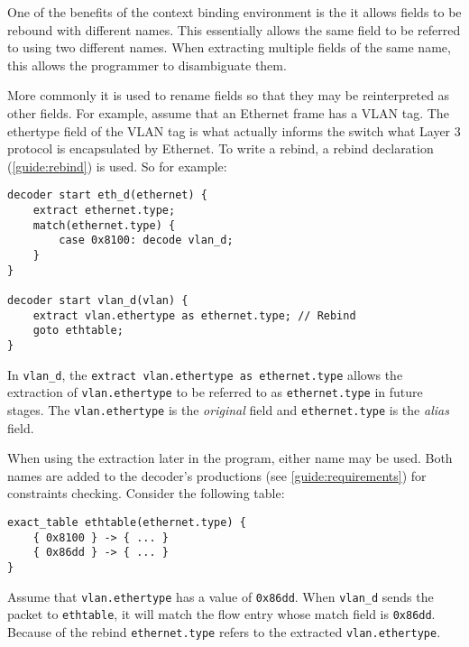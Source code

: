 One of the benefits of the context binding environment is the it
allows fields to be rebound with different names. This essentially
allows the same field to be referred to using two different names.
When extracting multiple fields of the same name, this allows the
programmer to disambiguate them. 

More commonly it is used to rename fields so that they may be reinterpreted as other fields. For example, assume that an Ethernet
frame has a VLAN tag. The ethertype field of the VLAN tag is what 
actually informs the switch what Layer 3 protocol is encapsulated
by Ethernet. 
To write a rebind, a rebind declaration (\ref{guide:rebind}) is used.
So for example:

\begin{codepage}
\begin{lstlisting}
decoder start eth_d(ethernet) {
	extract ethernet.type;
	match(ethernet.type) {
		case 0x8100: decode vlan_d;
	}
}

decoder start vlan_d(vlan) {
	extract vlan.ethertype as ethernet.type; // Rebind
	goto ethtable;
}
\end{lstlisting}
\end{codepage}

In \texttt{vlan\_d}, the \texttt{extract vlan.ethertype as ethernet.type} allows the extraction of \texttt{vlan.ethertype} to be referred to as
\texttt{ethernet.type} in future stages. The \texttt{vlan.ethertype}
is the \emph{original} field and \texttt{ethernet.type} is the \emph{alias} field.

When using the extraction later in the program, either name may be used.  
Both names are added to the decoder's productions (see \ref{guide:requirements}) for constraints checking. 
Consider the following table:

\begin{codepage}
\begin{lstlisting}
exact_table ethtable(ethernet.type) {
	{ 0x8100 } -> { ... }
	{ 0x86dd } -> { ... }
}
\end{lstlisting}
\end{codepage}

Assume that \texttt{vlan.ethertype} has a value of \texttt{0x86dd}.
When \texttt{vlan\_d} sends the packet to \texttt{ethtable}, it will
match the flow entry whose match field is \texttt{0x86dd}. Because of
the rebind \texttt{ethernet.type} refers to the extracted \texttt{vlan.ethertype}.

